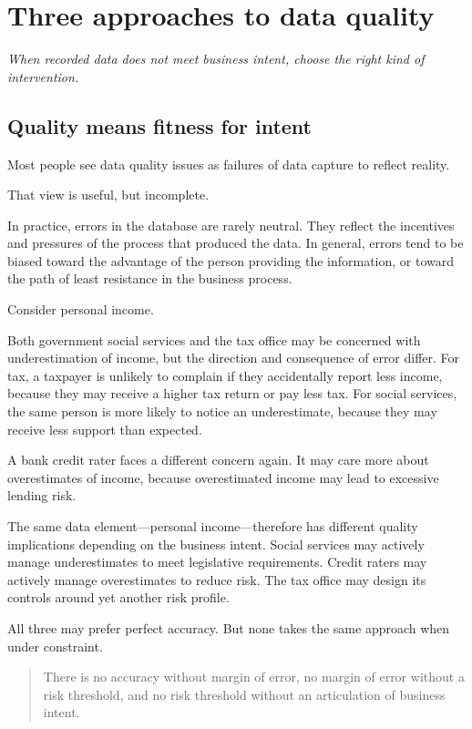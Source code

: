 \documentclass[10pt,openany,10pt]{book}
\newcounter{none}
\begin{document}
\newpage

\chapter{Three approaches to data
quality}\label{docs-quality-reliability-three-approaches-to-data-quality}

\emph{When recorded data does not meet business intent, choose the right
kind of intervention.}

\section{Quality means fitness for
intent}\label{quality-means-fitness-for-intent}

Most people see data quality issues as failures of data capture to
reflect reality.

That view is useful, but incomplete.

In practice, errors in the database are rarely neutral. They reflect the
incentives and pressures of the process that produced the data. In
general, errors tend to be biased toward the advantage of the person
providing the information, or toward the path of least resistance in the
business process.

Consider personal income.

Both government social services and the tax office may be concerned with
underestimation of income, but the direction and consequence of error
differ. For tax, a taxpayer is unlikely to complain if they accidentally
report less income, because they may receive a higher tax return or pay
less tax. For social services, the same person is more likely to notice
an underestimate, because they may receive less support than expected.

A bank credit rater faces a different concern again. It may care more
about overestimates of income, because overestimated income may lead to
excessive lending risk.

The same data element---personal income---therefore has different
quality implications depending on the business intent. Social services
may actively manage underestimates to meet legislative requirements.
Credit raters may actively manage overestimates to reduce risk. The tax
office may design its controls around yet another risk profile.

All three may prefer perfect accuracy. But none takes the same approach
when under constraint.

\begin{quote}
There is no accuracy without margin of error, no margin of error without
a risk threshold, and no risk threshold without an articulation of
business intent.
\end{quote}
\end{document}
